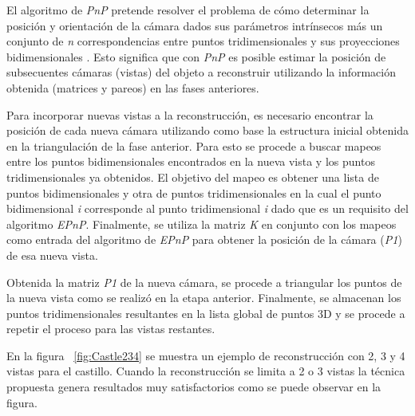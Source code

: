 El algoritmo de \textit{PnP} pretende resolver el problema de c\'{o}mo determinar la posici\'{o}n y orientaci\'{o}n de la c\'{a}mara dados sus par\'{a}metros intr\'{i}nsecos m\'{a}s un conjunto de \textit{n} correspondencias entre puntos tridimensionales y sus proyecciones bidimensionales \cite{F_Moreno_V_Lepetit}. Esto significa que con \textit{PnP} es posible estimar la posici\'{o}n de subsecuentes c\'{a}maras (vistas) del objeto a reconstruir utilizando la informaci\'{o}n obtenida (matrices y pareos) en las fases anteriores.

Para incorporar nuevas vistas a la reconstrucci\'{o}n, es necesario encontrar la posici\'{o}n de cada nueva c\'{a}mara utilizando como base la estructura inicial obtenida en la triangulaci\'{o}n de la fase anterior. Para esto se procede a buscar mapeos entre los puntos bidimensionales encontrados en la nueva vista y los puntos tridimensionales ya obtenidos. El objetivo del mapeo es obtener una lista de puntos bidimensionales y otra de puntos tridimensionales en la cual el punto bidimensional \textit{i} corresponde al punto tridimensional \textit{i} dado que es un requisito del algoritmo \textit{EPnP}. Finalmente, se utiliza la matriz \textit{K} en conjunto con los mapeos como entrada del algoritmo de \textit{EPnP} para obtener la posici\'{o}n de la c\'{a}mara (\textit{P1}) de esa nueva vista.

Obtenida la matriz \textit{P1} de la nueva c\'{a}mara, se procede a triangular los puntos de la nueva vista como se realiz\'{o} en la etapa anterior. Finalmente, se almacenan los puntos tridimensionales resultantes en la lista global de puntos 3D y se procede a repetir el proceso para las vistas restantes.

En la figura ~\ref{fig:Castle234} se muestra un ejemplo de reconstrucci\'{o}n con 2, 3 y 4 vistas para el castillo. Cuando la reconstrucci\'{o}n se limita a 2 o 3 vistas la t\'{e}cnica propuesta genera resultados muy satisfactorios como se puede observar en la figura.


